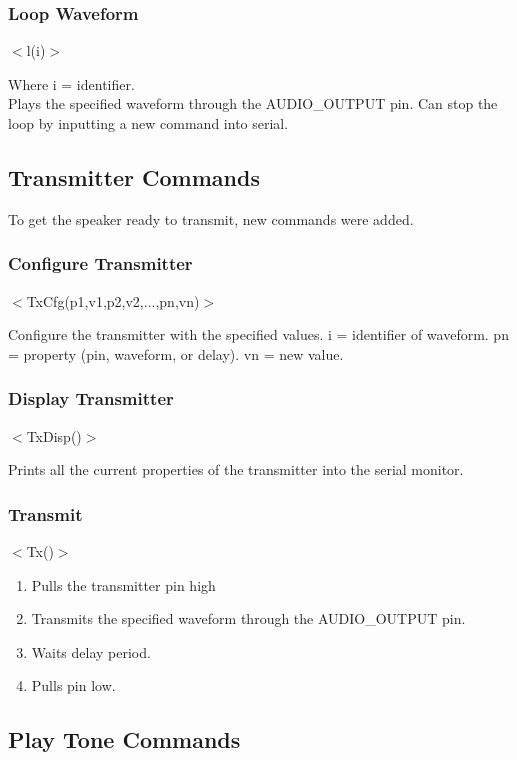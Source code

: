 \documentclass[12pt, a4paper]{article}
\begin{document}
\subsubsection{Loop Waveform}
\begin{center}
	$<$l(i)$>$
\end{center}
Where i = identifier. \\
Plays the specified waveform through the AUDIO\_OUTPUT pin. Can stop the loop by inputting a new command into serial. 

\subsection{Transmitter Commands}
To get the speaker ready to transmit, new commands were added. 
\subsubsection{Configure Transmitter}
\begin{center}
	$<$TxCfg(p1,v1,p2,v2,...,pn,vn)$>$
\end{center}
Configure the transmitter with the specified values. i = identifier of waveform. pn = property (pin, waveform, or delay). vn = new value.

\subsubsection{Display Transmitter}
\begin{center}
	$<$TxDisp()$>$
\end{center}
Prints all the current properties of the transmitter into the serial monitor.

\subsubsection{Transmit}
\begin{center}
	$<$Tx()$>$
\end{center}

\begin{enumerate}
	\item Pulls the transmitter pin high
	\item Transmits the specified waveform through the AUDIO\_OUTPUT pin.
	\item Waits delay period.
	\item Pulls pin low.
\end{enumerate}

\subsection{Play Tone Commands}
\end{document}
